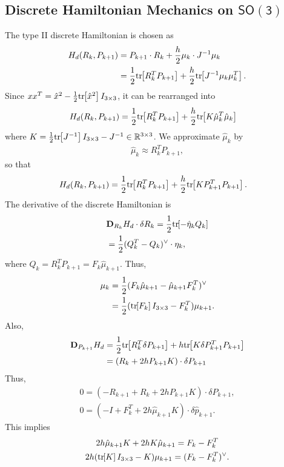 \documentclass[letterpaper, 10pt, conference]{ieeeconf}
\newcommand{\bracket}[1]{\ensuremath{\left[ #1 \right]}}
\newcommand{\tr}[1]{\mbox{tr}\ensuremath{\negthickspace\bracket{#1}}}
\newcommand{\SO}{\ensuremath{\mathsf{SO(3)}}}
\renewcommand{\Re}{\ensuremath{\mathbb{R}}}
\newcommand{\D}{\ensuremath{\mathbf{D}}}
\begin{document}
\subsection{Discrete Hamiltonian Mechanics on $\SO$}
The type II discrete Hamiltonian is chosen as
\begin{align*}
    H_d (R_k, P_{k+1}) 
    & = P_{k+1} \cdot R_k   + \frac{h}{2} \mu_k \cdot J^{-1} \mu_k\\
    & = \frac{1}{2}\tr{R_k^T P_{k+1}}   + \frac{h}{2} \tr{ J^{-1} \mu_k\mu_k^T}.
\end{align*}
Since $xx^T = \hat x^2 -\frac{1}{2}\tr{\hat x^2}I_{3\times 3}$, it can be rearranged into
\begin{align*}
    H_d (R_k, P_{k+1}) 
     & = \frac{1}{2}\tr{R_k^T P_{k+1}}   + \frac{h}{2} \tr{ K \hat \mu_k^T \hat \mu_k} 
\end{align*}
where $K = \frac{1}{2}\tr{J^{-1}} I_{3\times 3}-J^{-1} \in\Re^{3\times 3} $.
We approximate $\hat \mu_k$ by 
\begin{align*}
    \hat \mu_k \approx R_k^T P_{k+1},
\end{align*}
so that
\begin{align*}
    H_d (R_k, P_{k+1}) 
    & = \frac{1}{2}\tr{R_k^T P_{k+1}}   + \frac{h}{2} \tr{ K P_{k+1}^T P_{k+1} }.
\end{align*}
The derivative of the discrete Hamiltonian is
\begin{align*}
    & \D_{R_k} H_d \cdot \delta R_k 
    =\frac{1}{2} \tr{-\hat\eta_k Q_k} \\
    & = \frac{1}{2} ( Q_k^T- Q_k )^\vee\cdot \eta_k,
\end{align*}
where $Q_k = R_k^T P_{k+1} = F_k \hat\mu_{k+1}$.
Thus,
\begin{align}
    \mu_k 
          & = \frac{1}{2} (F_k\hat\mu_{k+1}-\hat\mu_{k+1}F_k^T )^\vee\nonumber \\
          & = \frac{1}{2}(\tr{F_k}I_{3\times 3}-F_k^T)  \mu_{k+1}.
\end{align}
Also,
\begin{align*}
    \D_{P_{k+1}} H_d & = \frac{1}{2}\tr{ R_k^T \delta P_{k+1}} + h\tr{K \delta P_{k+1}^T P_{k+1} } \\
                     & = ( R_k + 2h P_{k+1}K ) \cdot \delta P_{k+1}
\end{align*}
Thus, 
\begin{gather*}
0 = (- R_{k+1} +  R_k + 2h P_{k+1}K ) \cdot \delta P_{k+1},\\
0 = (- I +  F_k^T + 2h \hat\mu_{k+1} K ) \cdot \delta \hat p_{k+1}.
\end{gather*}
This implies
\begin{gather}
    2h \hat\mu_{k+1} K + 2h K \hat\mu_{k+1} = F_k - F_k^T\nonumber\\
2h (\tr{K}I_{3\times 3} - K )\mu_{k+1} = (F_k- F_k^T)^\vee.
\end{gather}
\end{document}
